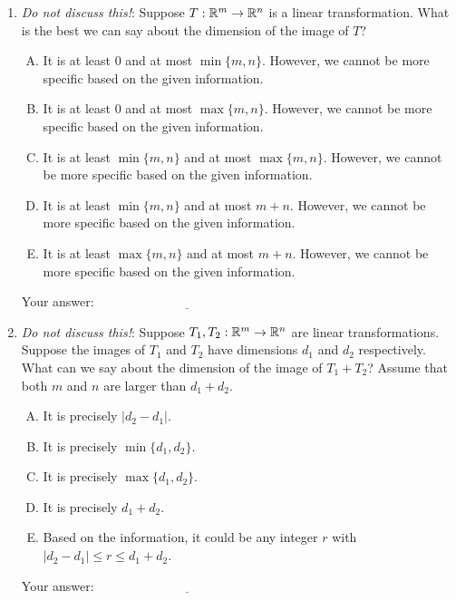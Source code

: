\documentclass[10pt]{amsart}
\begin{document}
\begin{enumerate}
\item {\em Do not discuss this!}: Suppose $T:\mathbb{R}^m \to \mathbb{R}^n$ is a
  linear transformation. What is the best we can say about the
  dimension of the image of $T$?

  \begin{enumerate}[(A)]
  \item It is at least $0$ and at most $\min \{m,n\}$. However, we
    cannot be more specific based on the given information.
  \item It is at least $0$ and at most $\max \{m,n \}$. However, we
    cannot be more specific based on the given information.
  \item It is at least $\min \{ m,n \}$ and at most $\max \{ m,n
    \}$. However, we cannot be more specific based on the given information.
  \item It is at least $\min \{ m,n \}$ and at most $m + n$. However,
    we cannot be more specific based on the given information.
  \item It is at least $\max \{ m,n \}$ and at most $m + n$. However,
    we cannot be more specific based on the given information.
  \end{enumerate}

  \vspace{0.1in}
  Your answer: $\underline{\qquad\qquad\qquad\qquad\qquad\qquad\qquad}$

\item {\em Do not discuss this!}: Suppose $T_1,T_2:\mathbb{R}^m \to \mathbb{R}^n$ are
  linear transformations. Suppose the images of $T_1$ and $T_2$ have
  dimensions $d_1$ and $d_2$ respectively. What can we say about the
  dimension of the image of $T_1 + T_2$? Assume that both $m$ and $n$
  are larger than $d_1 + d_2$.

  \begin{enumerate}[(A)]
  \item It is precisely $|d_2 - d_1|$.
  \item It is precisely $\min \{ d_1, d_2 \}$.
  \item It is precisely $\max \{ d_1, d_2 \}$.
  \item It is precisely $d_1 + d_2$.
  \item Based on the information, it could be any integer $r$ with
    $|d_2 - d_1| \le r \le d_1 + d_2$.
  \end{enumerate}

  \vspace{0.1in}
  Your answer: $\underline{\qquad\qquad\qquad\qquad\qquad\qquad\qquad}$


\end{enumerate}
\end{document}
